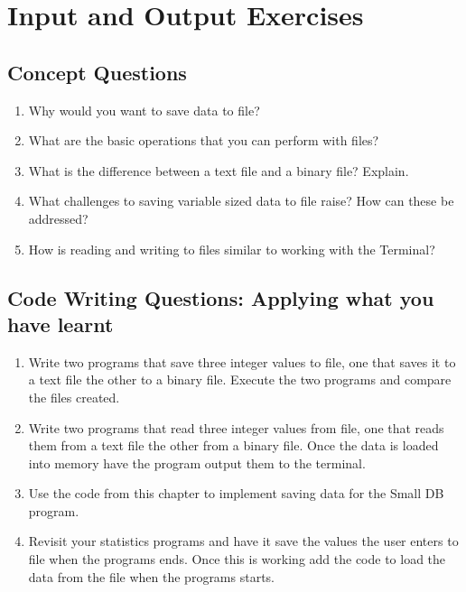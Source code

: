 \clearpage
\section{Input and Output Exercises} %
\label{sec:input_and_output_exercises}

\subsection{Concept Questions} %
\label{sub:file-io-concept_questions}

\begin{enumerate}
  \item Why would you want to save data to file?
  \item What are the basic operations that you can perform with files?
  \item What is the difference between a text file and a binary file? Explain. 
  \item What challenges to saving variable sized data to file raise? How can these be addressed?
  \item How is reading and writing to files similar to working with the Terminal?
\end{enumerate}


\subsection{Code Writing Questions: Applying what you have learnt} %
\label{sub:code_writing_questions_applying_what_you_have_learnt}

\begin{enumerate}
  \item Write two programs that save three integer values to file, one that saves it to a text file the other to a binary file. Execute the two programs and compare the files created.
  \item Write two programs that read three integer values from file, one that reads them from a text file the other from a binary file. Once the data is loaded into memory have the program output them to the terminal.
  \item Use the code from this chapter to implement saving data for the Small DB program.
  \item Revisit your statistics programs and have it save the values the user enters to file when the programs ends. Once this is working add the code to load the data from the file when the programs starts.
\end{enumerate}

